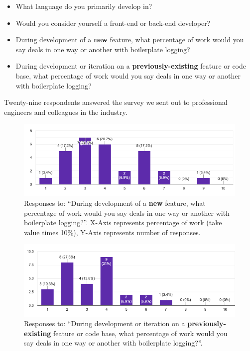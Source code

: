 \documentclass[acmsmall,review,authorversion]{acmart}
\begin{document}
\begin{itemize}
    \item What language do you primarily develop in?
    \item Would you consider yourself a front-end or back-end developer?
    \item During development of a \textbf{new} feature, what percentage of work would you say deals in one way or another with boilerplate logging?
    \item During development or iteration on a \textbf{previously-existing} feature or code base, what percentage of work would you say deals in one way or another with boilerplate logging?
\end{itemize}

Twenty-nine respondents answered the survey we sent out to professional engineers and colleagues in the industry.

\begin{figure}[h]
\includegraphics[width=\linewidth]{images/bp_survey_time_new.png}
\caption{Responses to: ``During development of a \textbf{new} feature, what percentage of work would you say deals in one way or another with boilerplate logging?''. X-Axis represents percentage of work (take value times 10\%), Y-Axis represents number of responses.}
\label{fig:new}
\centering
\end{figure}

\begin{figure}[h]
\includegraphics[width=\linewidth]{images/bp_survey_time_prev.png}
\caption{Responses to: ``During development or iteration on a \textbf{previously-existing} feature or code base, what percentage of work would you say deals in one way or another with boilerplate logging?''.}
\label{fig:prev}
\centering
\end{figure}
\end{document}
